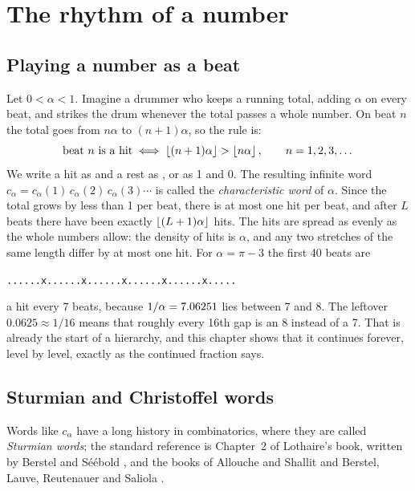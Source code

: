 \chapter{The rhythm of a number}\label{ch:rhythm}

\section{Playing a number as a beat}

Let $0 < \alpha < 1$. Imagine a drummer who keeps a running total, adding $\alpha$ on every beat, and strikes the drum whenever the total passes a whole number. On beat $n$ the total goes from $n\alpha$ to $(n+1)\alpha$, so the rule is:
\begin{equation}\label{eq:beat-rule}
  \text{beat } n \text{ is a hit} \iff \left\lfloor (n+1)\alpha\right\rfloor > \left\lfloor n\alpha\right\rfloor, \qquad n = 1, 2, 3, \dots
\end{equation}
We write a hit as \hit{} and a rest as \rest{}, or as 1 and 0. The resulting infinite word $c_\alpha = c_\alpha(1)\,c_\alpha(2)\,c_\alpha(3)\cdots$ is called the \emph{characteristic word} of $\alpha$. Since the total grows by less than 1 per beat, there is at most one hit per beat, and after $L$ beats there have been exactly $\left\lfloor (L+1)\alpha\right\rfloor$ hits. The hits are spread as evenly as the whole numbers allow: the density of hits is $\alpha$, and any two stretches of the same length differ by at most one hit. For $\alpha = \pi - 3$ the first 40 beats are
\begin{center}
\texttt{......x......x......x......x......x.....}
\end{center}
a hit every 7 beats, because $1/\alpha = 7.06251$ lies between 7 and 8. The leftover $0.0625 \approx 1/16$ means that roughly every 16th gap is an 8 instead of a 7. That is already the start of a hierarchy, and this chapter shows that it continues forever, level by level, exactly as the continued fraction says.

\section{Sturmian and Christoffel words}

Words like $c_\alpha$ have a long history in combinatorics, where they are called \emph{Sturmian words}; the standard reference is Chapter~2 of Lothaire's book, written by Berstel and Séébold \citep{Lothaire2002}, and the books of Allouche and Shallit \citep[Ch.~9]{AlloucheShallit2003} and Berstel, Lauve, Reutenauer and Saliola \citep{BerstelChristoffel2009}.

